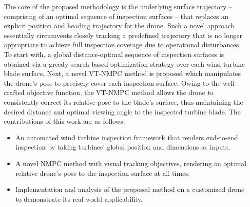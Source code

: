 The core of the proposed methodology is the underlying surface trajectory -- comprising of an optimal sequence of inspection surfaces -- that replaces an explicit position and heading trajectory for the drone. Such a novel approach essentially circumvents closely tracking a predefined trajectory that is no longer appropriate to achieve full inspection coverage due to operational disturbances. To start with, a global distance-optimal sequence of inspection surfaces is obtained via a greedy search-based optimization strategy over each wind turbine blade surface. Next, a novel \ac{VT-NMPC} method is proposed which manipulates the drone's pose to precisely cover each inspection surface. Owing to the well-crafted objective function, the \ac{VT-NMPC} method allows the drone to consistently correct its relative pose to the blade's surface, thus maintaining the desired distance and optimal viewing angle to the inspected turbine blade. %
The contributions of this work are as follows:


\begin{itemize}
    \item %
    An automated wind turbine inspection framework that renders end-to-end inspection by taking turbines' global position and dimensions as inputs.
 

    \item A novel \ac{NMPC} method with visual tracking objectives, rendering an optimal relative drone's pose to the inspection surface at all times. 
    
    \item Implementation and analysis of the proposed method
on a customized drone to demonstrate its real-world applicability.

\end{itemize}


